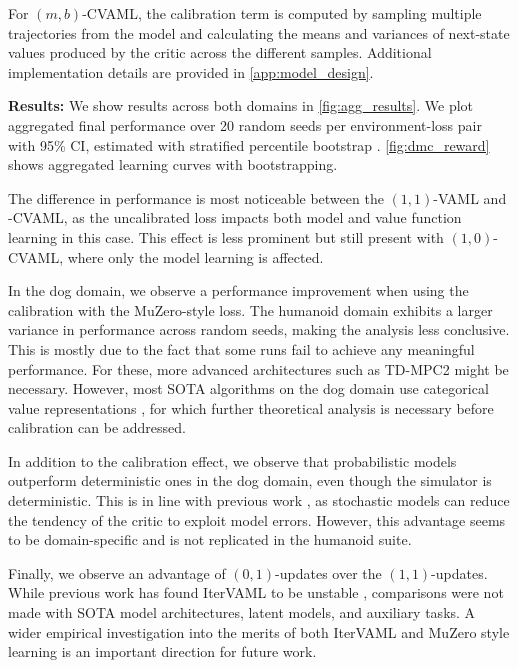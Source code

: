 For $(m,b)$-CVAML, the calibration term is computed by sampling multiple trajectories from the model and calculating the means and variances of next-state values produced by the critic across the different samples.
Additional implementation details are provided in \autoref{app:model_design}.

\textbf{Results:} We show results across both domains in \autoref{fig:agg_results}.
We plot aggregated final performance over 20 random seeds per environment-loss pair with 95\% CI,  estimated with stratified percentile bootstrap \cite{agarwal2021deep}.
\autoref{fig:dmc_reward} shows aggregated learning curves with bootstrapping.

The difference in performance is most noticeable between the $(1,1)$-VAML and -CVAML, as the uncalibrated loss impacts both model and value function learning in this case. 
This effect is less prominent but still present with $(1,0)$-CVAML, where only the model learning is affected.

In the dog domain, we observe a performance improvement when using the calibration with the MuZero-style loss.
The humanoid domain exhibits a larger variance in performance across random seeds, making the analysis less conclusive.
This is mostly due to the fact that some runs fail to achieve any meaningful performance.
For these, more advanced architectures such as TD-MPC2 \parencite{hansen2024tdmpc} might be necessary.
However, most SOTA algorithms on the dog domain use categorical value representations \parencite{farebrother2024stop}, for which further theoretical analysis is necessary before calibration can be addressed.

In addition to the calibration effect, we observe that probabilistic models outperform deterministic ones in the dog domain, even though the simulator is deterministic.
This is in line with previous work \parencite{pets,mbpo}, as stochastic models can reduce the tendency of the critic to exploit model errors.
However, this advantage seems to be domain-specific and is not replicated in the humanoid suite.

Finally, we observe an advantage of $(0,1)$-updates over the $(1,1)$-updates.
While previous work has found IterVAML to be unstable \parencite{lovatto2020decision,voelcker2022value}, comparisons were not made with SOTA model architectures, latent models, and auxiliary tasks.
A wider empirical investigation into the merits of both IterVAML and MuZero style learning is an important direction for future work.

